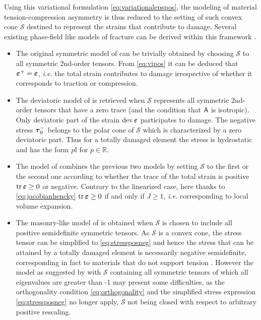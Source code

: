 Using this variational formulation \eqref{eq:variationalepspos}, the modeling of material tension-compression asymmetry is thus reduced to the setting of such convex cone $\mathcal{S}$ destined to represent the strains that contribute to damage. Several existing phase-field like models of fracture can be derived within this framework \cite{FreddiRoyer-Carfagni:2010}.
\begin{itemize}
\item The original symmetric model of \cite{BourdinFrancfortMarigo:2000} can be trivially obtained by choosing $\mathcal{S}$ to all symmetric 2nd-order tensors. From \eqref{eq:vipos} it can be deduced that $\eps^+=\eps$, \emph{i.e.} the total strain contributes to damage irrespective of whether it corresponds to traction or compression.

\item The deviatoric model of \cite{LancioniRoyer-Carfagni:2009} is retrieved when $\mathcal{S}$ represents all symmetric 2nd-order tensors that have a zero trace (and the condition that $\mathsf{A}$ is isotropic). Only deviatoric part of the strain $\dev\eps$ participates to damage. The negative stress $\vtau_0^-$ belongs to the polar cone of $\mathcal{S}$ which is characterized by a zero deviatoric part. Thus for a totally damaged element the stress is hydrostatic and has the form $p\mathbb{I}$ for $p\in\mathbb{R}$.

\item The model of \cite{AmorMarigoMaurini:2009} combines the previous two models by setting $\mathcal{S}$ to the first or the second one according to whether the trace of the total strain is positive $\tr\eps\geq 0$ or negative. Contrary to the linearized case, here thanks to \eqref{eq:jacobianhencky} $\tr\eps\geq 0$ if and only if $J\geq 1$, \emph{i.e.} corresponding to local volume expansion.

\item The masonry-like model of \cite{FreddiRoyer-Carfagni:2010} is obtained when $\mathcal{S}$ is chosen to include all positive semidefinite symmetric tensors. As $\mathcal{S}$ is a convex cone, the stress tensor can be simplified to \eqref{eq:stressposneg} and hence the stress that can be attained by a totally damaged element is necessarily negative semidefinite, corresponding in fact to materials that do not support tension \cite{PieroLancioniMarch:2007}. However the model as suggested by \cite{FreddiRoyer-Carfagni:2010} with $\mathcal{S}$ containing all symmetric tensors of which all eigenvalues are greater than -1 may present some difficulties, as the orthogonality condition \eqref{eq:orthogonality} and the simplified stress expression \eqref{eq:stressposneg} no longer apply, $\mathcal{S}$ not being closed with respect to arbitrary positive rescaling.
\end{itemize}

